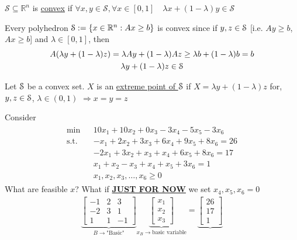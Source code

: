 \begin{definition-N}
	$\mathcal{S} \subseteq \mathbb{R}^n$ is \underline{convex} if $\forall x,y \in \mathcal{S}, \forall x \in [0,1] \quad \lambda x + (1-\lambda)y \in \mathcal{S}$
	\begin{example-N}
		Every polyhedron $\mathcal{S} := \{x \in \mathbb{R}^n: Ax \geq b\}$ is convex since if $y,z \in \mathcal{S}$ [i.e. $Ay \geq b$, $Ax \geq b$] and $\lambda \in [0,1]$, then
		\begin{gather*}
			A(\lambda y + (1-\lambda)z) = \lambda A y + (1-\lambda) Az \geq \lambda b + (1 - \lambda)b = b\\
			\lambda y + (1-\lambda)z \in \mathcal{S}
		\end{gather*}
	\end{example-N}
\end{definition-N}
\begin{definition-N}
	Let $\mathcal{S}$ be a convex set. $X$ is an \underline{extreme point of $\mathcal{S}$} if $X = \lambda y + (1-\lambda)z$ for, $y,z \in \mathcal{S}$, $\lambda \in (0,1)$ $\Rightarrow x = y = z$
	\begin{example-N}
		Consider
		\begin{gather*}
			\begin{aligned}
				\text{min} && 10x_1 + 10x_2 + 0x_3 - 3x_4 - 5x_5 - 3x_6\\
				\text{s.t.} && -x_1 + 2x_2 + 3x_3 +6x_4 +9x_5 +8x_6 = 26\\
				&& -2x_1 + 3x_2 + x_3 +x_4 +6x_5 +8x_6 = 17\\
				&& x_1 + x_2 -x_3 +x_4 +x_5 +3x_6 = 1\\
				&& x_1, x_2, x_3, \ldots, x_6 \geq 0
			\end{aligned}
		\end{gather*}
		What are feasible $x$? What if \underline{\textbf{JUST FOR NOW}} we set $x_4, x_5, x_6 = 0$
		\begin{gather*}
			\underbrace{\begin{bmatrix}
				-1 & 2 & 3\\
				-2 & 3 & 1\\
				1 & 1 & -1
			\end{bmatrix}}_{B \rightarrow \text{"Basic"}}
			\underbrace{\begin{bmatrix}
				x_1\\x_2\\x_3
			\end{bmatrix}}_{x_B \rightarrow \text{basic variable}} = 
			\underbrace{\begin{bmatrix}
				26\\17\\1

\end{bmatrix}}
\end{gather*}
\end{example-N}
\end{definition-N}
